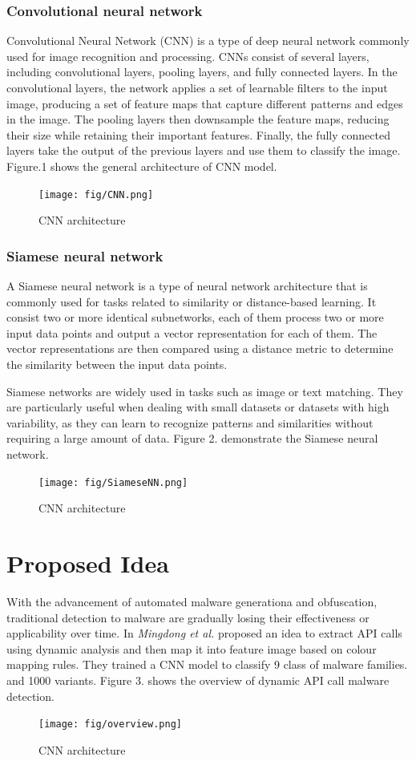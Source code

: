 \documentclass{article}
\begin{document}
\subsubsection{Convolutional neural network}
Convolutional Neural Network (CNN) is a type of deep neural network commonly used for image recognition and processing. 
CNNs consist of several layers, including convolutional layers, pooling layers, and fully connected layers. In the convolutional layers, the network applies a set of learnable filters to the input image, 
producing a set of feature maps that capture different patterns and edges in the image. The pooling layers then downsample the feature maps, reducing their size while retaining their important features. Finally, 
the fully connected layers take the output of the previous layers and use them to classify the image. Figure.1 shows the general architecture of CNN model.
\begin{figure}
    \texttt{[image: fig/CNN.png]}    
    \caption{CNN architecture}
\end{figure}
\subsubsection{Siamese neural network}
A Siamese neural network is a type of neural network architecture that is commonly used for tasks related to similarity or distance-based learning.
It consist two or more identical subnetworks, each of them process two or more input data points and output a vector representation for each of them. 
The vector representations are then compared using a distance metric to determine the similarity between the input data points.

Siamese networks are widely used in tasks such as image or text matching.
They are particularly useful when dealing with small datasets or datasets with high variability, 
as they can learn to recognize patterns and similarities without requiring a large amount of data.
Figure 2. demonstrate the Siamese neural network.
\begin{figure}
    \texttt{[image: fig/SiameseNN.png]}    
    \caption{CNN architecture}
\end{figure}
\section{Proposed Idea}
With the advancement of automated malware generationa and obfuscation, 
traditional detection to malware are gradually losing their effectiveness or applicability over time.
In \cite{ref3} \textit{Mingdong et al.} proposed an idea to extract API calls using dynamic analysis and then 
map it into feature image based on colour mapping rules. They trained a CNN model to classify 9 class of malware families.
and 1000 variants. Figure 3. shows the overview of dynamic API call malware detection.
\begin{figure}
    \texttt{[image: fig/overview.png]}    
    \caption{CNN architecture}
\end{figure}
\end{document}
